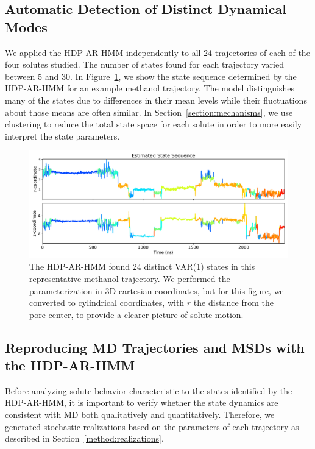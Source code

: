 \documentclass[journal=jpcbfk,manuscript=article]{achemso}
\begin{document}
  \subsection{Automatic Detection of Distinct Dynamical Modes}\label{section:find_modes}
  
  We applied the HDP-AR-HMM independently to all 24 trajectories of each of the four solutes studied.
  The number of states found for each trajectory varied between 5 and 30.  %
  In Figure~\ref{fig:rz_unclustered}, we show the state sequence determined by the HDP-AR-HMM for
  an example methanol trajectory. The model distinguishes many of the states due to 
  differences in their mean levels while their fluctuations about those means are often 
  similar. In Section~\ref{section:mechanisms}, we use clustering to reduce the total state
  space for each solute in order to more easily interpret the state parameters.
  
  \begin{figure}
  \centering
  \includegraphics[width=\textwidth]{rz_unclustered_MET.pdf}
  \caption{The HDP-AR-HMM found 24 distinct VAR(1) states in this representative methanol trajectory.
  We performed the parameterization in 3D cartesian coordinates, but for this figure, we 
  converted to cylindrical coordinates, with $r$ the distance from the pore center, to 
  provide a clearer picture of solute motion.}\label{fig:rz_unclustered}
  \end{figure}
  
  \subsection{Reproducing MD Trajectories and MSDs with the HDP-AR-HMM}\label{section:unclustered_MSD_prediction}

  Before analyzing solute behavior characteristic to the states identified by the
  HDP-AR-HMM, it is important to verify whether the state dynamics are consistent with MD
  both qualitatively and quantitatively. Therefore, we generated stochastic 
  realizations based on the parameters of each trajectory as described in 
  Section~\ref{method:realizations}.
  
\end{document}
